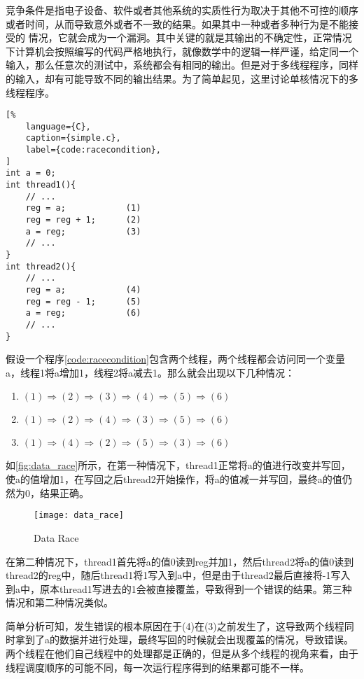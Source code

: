竞争条件是指电子设备、软件或者其他系统的实质性行为取决于其他不可控的顺序或者时间，从而导致意外或者不一致的结果。如果其中一种或者多种行为是不能接受的 情况，它就会成为一个漏洞。其中关键的就是其输出的不确定性，正常情况下计算机会按照编写的代码严格地执行，就像数学中的逻辑一样严谨，给定同一个输入，那么任意次的测试中，系统都会有相同的输出。但是对于多线程程序，同样的输入，却有可能导致不同的输出结果。为了简单起见，这里讨论单核情况下的多线程程序。

\begin{spacing}{1.0}
\begin{lstlisting}[%
    language={C},
    caption={simple.c},
    label={code:racecondition},
]
int a = 0;
int thread1(){
    // ...
    reg = a;            (1)
    reg = reg + 1;      (2)
    a = reg;            (3)
    // ...
}
int thread2(){
    // ...
    reg = a;            (4)
    reg = reg - 1;      (5)
    a = reg;            (6)
    // ...
}
\end{lstlisting}
\end{spacing}

假设一个程序\autoref{code:racecondition}包含两个线程，两个线程都会访问同一个变量a，线程1将a增加1，线程2将a减去1。那么就会出现以下几种情况：

\begin{enumerate}
\item $(1) \Rightarrow (2) \Rightarrow (3) \Rightarrow (4) \Rightarrow (5) \Rightarrow (6)$
\item $(1) \Rightarrow (2) \Rightarrow (4) \Rightarrow (3) \Rightarrow (5) \Rightarrow (6)$
\item $(1) \Rightarrow (4) \Rightarrow (2) \Rightarrow (5) \Rightarrow (3) \Rightarrow (6)$
\end{enumerate}

如\autoref{fig:data_race}所示，在第一种情况下，thread1正常将a的值进行改变并写回，使a的值增加1，在写回之后thread2开始操作，将a的值减一并写回，最终a的值仍然为0，结果正确。

\begin{figure}[ht]
    \centering
    \texttt{[image: data\_race]}
    \caption{\label{fig:data_race}Data Race}
\end{figure}


在第二种情况下，thread1首先将a的值0读到reg并加1，然后thread2将a的值0读到thread2的reg中，随后thread1将1写入到a中，但是由于thread2最后直接将-1写入到a中，原本thread1写进去的1会被直接覆盖，导致得到一个错误的结果。第三种情况和第二种情况类似。

简单分析可知，发生错误的根本原因在于(4)在(3)之前发生了，这导致两个线程同时拿到了a的数据并进行处理，最终写回的时候就会出现覆盖的情况，导致错误。两个线程在他们自己线程中的处理都是正确的，但是从多个线程的视角来看，由于线程调度顺序的可能不同，每一次运行程序得到的结果都可能不一样。

